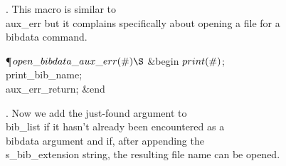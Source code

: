 .
This macro is similar to \\{aux\_err} but it complains specifically about
opening a file for a \.{\\bibdata} command.

\Y\P\D {}$\\{open\_bibdata\_aux\_err}(\#)\S$\1\6
\&{begin} $\\{print}(\#)$;\5
\\{print\_bib\_name};\5
\\{aux\_err\_return};\6
\&{end}\2\par
\fi

.
Now we add the just-found argument to \\{bib\_list} if it hasn't already
been encountered as a \.{\\bibdata} argument and if, after appending
the \\{s\_bib\_extension} string, the resulting file name can be opened.

